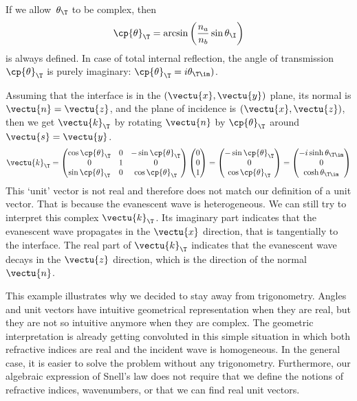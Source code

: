 \begin{refsection}
If we allow~$\theta_\T$ to be complex, then
\begin{equation}
    \cp{\theta}_\T = \arcsin
    \left(
        \frac{n_a}{n_b} \sin \theta_\I
    \right)
\end{equation}
is always defined.
In case of total internal reflection, the angle of transmission~$\cp{\theta}_\T$ is purely imaginary: $\cp{\theta}_\T = i \theta_{\T \im})$.

Assuming that the interface is in the $(\vectu{x}, \vectu{y})$ plane, its normal is $\vectu{n}=\vectu{z}$, and the plane of incidence is $(\vectu{x}, \vectu{z})$, then we get $\vectu{k}_\T$ by rotating $\vectu{n}$ by $\cp{\theta}_\T$ around $\vectu{s}=\vectu{y}$.
\begin{equation}
    \vectu{k}_\T =
    \begin{pmatrix}
        \cos \cp{\theta}_\T   & 0 & -\sin \cp{\theta}_\T \\
        0 & 1 & 0\\
        \sin \cp{\theta}_\T   & 0 & \cos \cp{\theta}_\T \\
    \end{pmatrix}
    \begin{pmatrix}
        0 \\ 0 \\ 1
    \end{pmatrix}
    =
    \begin{pmatrix}
        -\sin \cp{\theta}_\T \\ 0 \\ \cos \cp{\theta}_\T
    \end{pmatrix}
    =
    \begin{pmatrix}
        -i \sinh \theta_{\T \im} \\ 0 \\ \cosh \theta_{\T \im}
    \end{pmatrix}
\end{equation}
This `unit' vector is not real and therefore does not match our definition of a unit vector.
That is because the evanescent wave is heterogeneous.
We can still try to interpret this complex $\vectu{k}_\T$.
Its imaginary part indicates that the evanescent wave propagates in the $\vectu{x}$ direction, that is tangentially to the interface.
The real part of $\vectu{k}_\T$ indicates that the evanescent wave decays in the $\vectu{z}$ direction, which is the direction of the normal $\vectu{n}$.

This example illustrates why we decided to stay away from trigonometry.
Angles and unit vectors have intuitive geometrical representation when they are real, but they are not so intuitive anymore when they are complex.
The geometric interpretation is already getting convoluted in this simple situation in which both refractive indices are real and the incident wave is homogeneous.
In the general case, it is easier to solve the problem without any trigonometry.
Furthermore, our algebraic expression of Snell's law does not require that we define the notions of refractive indices, wavenumbers, or that we can find real unit vectors.


\end{refsection}
